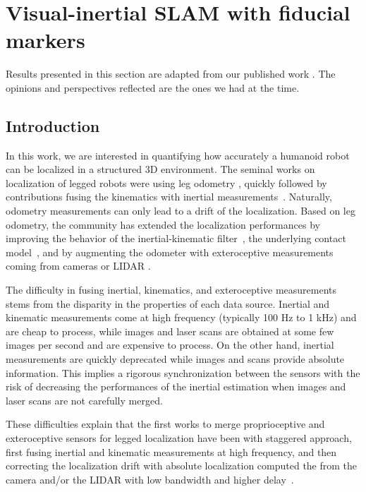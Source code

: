 \chapter{Visual-inertial SLAM with fiducial markers}
\label{chp:absolute_vi}
\minitoc
\bigskip

Results presented in this section are adapted from our published work \cite{fourmy2019absolute}. The opinions and perspectives reflected are the ones we had
at the time.

\section{Introduction}

In this work, we are interested in quantifying how accurately a humanoid robot can be localized in a structured 3D environment.
The seminal works on localization of legged robots were using leg odometry \cite{roston1991dead}, quickly followed by contributions fusing the kinematics 
with inertial measurements~\cite{lin2006sensor}. Naturally, odometry measurements can only lead to a drift of the localization.
Based on leg odometry, the community has extended the localization performances by improving the behavior of the inertial-kinematic 
filter~\cite{bloesch2013state,rotella2014state,flayols2017experimental}, the underlying contact 
model~\cite{bledt2018cheetah,rotella2018unsupervised}, and by augmenting the odometer with exteroceptive measurements coming from cameras 
or LIDAR \cite{stasse2006real, fallon2014drift, camurri2017multisensory}.

The difficulty in fusing inertial, kinematics, and exteroceptive measurements stems from the disparity in the properties of each data source.
Inertial and kinematic measurements come at high frequency (typically 100 Hz to 1 kHz) and are cheap to process, while images and laser scans 
are obtained at some few images per second and are expensive to process. 
On the other hand, inertial measurements are quickly deprecated while images and scans provide absolute information.
This implies a rigorous synchronization between the sensors with the risk of decreasing the performances of the inertial 
estimation when images and laser scans are not carefully merged. 

These difficulties explain that the first works to merge proprioceptive and exteroceptive sensors for legged localization 
have been with staggered approach, first fusing inertial and kinematic measurements at high frequency, and then correcting 
the localization drift with absolute localization computed the from the camera and/or the LIDAR with low bandwidth and higher 
delay~\cite{nobili2017heterogeneous,fallon2014drift}.

